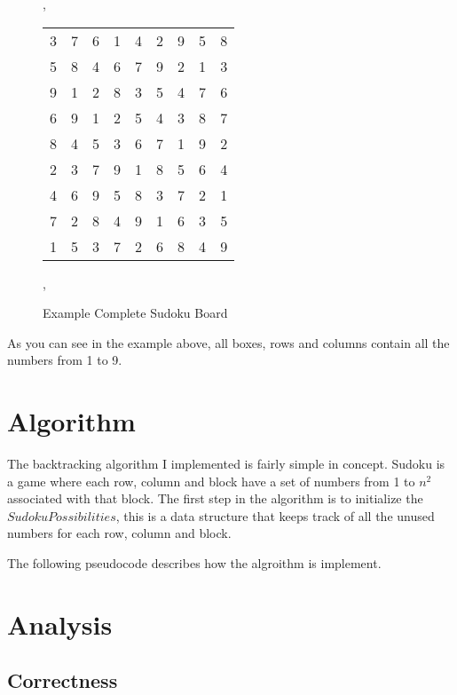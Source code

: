 \documentclass{sig-alternate-05-2015}
\begin{document}
\begin{figure}
    \begin{center}
        \sep
        \def\arraystretch{1.5}
        \begin{tabular}{| c c c | c c c | c c c |}
            \hline
            3&7&6&1&4&2&9&5&8 \\
            5&8&4&6&7&9&2&1&3 \\
            9&1&2&8&3&5&4&7&6 \\
            \hline
            6&9&1&2&5&4&3&8&7 \\
            8&4&5&3&6&7&1&9&2 \\
            2&3&7&9&1&8&5&6&4 \\
            \hline
            4&6&9&5&8&3&7&2&1 \\
            7&2&8&4&9&1&6&3&5 \\
            1&5&3&7&2&6&8&4&9 \\
            \hline
        \end{tabular}
        \sep
    \end{center}

    \caption{Example Complete Sudoku Board}
    \label{fig:example}
\end{figure}

As you can see in the example above, all boxes, rows and columns contain all
the numbers from 1 to 9.

\section{Algorithm}

The backtracking algorithm I implemented is fairly simple in concept. Sudoku is
a game where each row, column and block have a set of numbers from 1 to $n^2$
associated with that block. The first step in the algorithm is to initialize
the $SudokuPossibilities$, this is a data structure that keeps track of all
the unused numbers for each row, column and block.

The following pseudocode describes how the algroithm is implement.


\section{Analysis}

\subsection{Correctness}
\end{document}

